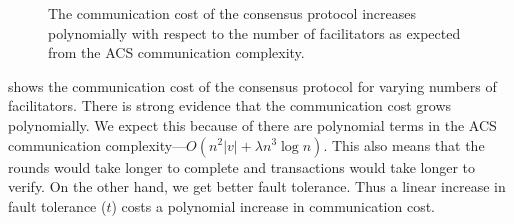 \begin{figure}[tb]
  \centering
  \caption{The communication cost of the consensus protocol increases polynomially with respect to the number of facilitators as expected from the ACS communication complexity.}
  \label{fig:facilitators-round-comms}
\end{figure}

 shows the communication cost of the consensus protocol for varying numbers of facilitators.
There is strong evidence that the communication cost grows polynomially.
We expect this because of there are polynomial terms in the ACS communication complexity---$O(n^2|v| + \lambda n^3 \log n)$.
This also means that the rounds would take longer to complete and transactions would take longer to verify.
On the other hand, we get better fault tolerance.
Thus a linear increase in fault tolerance ($t$) costs a polynomial increase in communication cost.
